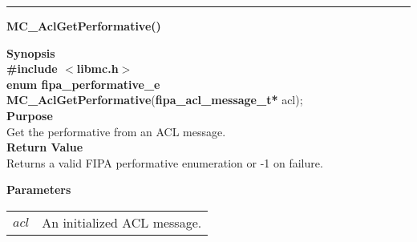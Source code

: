 \noindent
\vspace{5pt}
\rule{6.5in}{0.015in}
\noindent
{}
{\LARGE \bf MC\_AclGetPerformative()}\\
\label{api:MC_Acl_GetPerformative()}

\noindent
{\bf Synopsis}\\
{\bf \#include $<$libmc.h$>$}\\
{\bf enum fipa\_performative\_e MC\_AclGetPerformative}({\bf fipa\_acl\_message\_t*} acl);\\

\noindent
{\bf Purpose}\\
Get the performative from an ACL message.\\

\noindent
{\bf Return Value}\\
Returns a valid FIPA performative enumeration or -1 on failure.

\noindent
{\bf Parameters}
\vspace{-0.1in}
\begin{description}
\item
\begin{tabular}{p{10 mm}p{145 mm}} 
$acl$ & An initialized ACL message. \\
\end{tabular}
\end{description}


